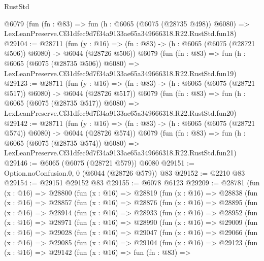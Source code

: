 \begin{lexlean}{RustStd}
\begin{coremodule}
    @6079
    (fun (fn : @83) =>
    fun (h : @6065 (@6075 (@28735 @498)) @6080) =>
    LexLeanPreserve.Cf31dfec9d7f34a9133ae65a349666318.R22.RustStd.fun18)
@29104 := @28711
    (fun (y : @16) => (fn : @83) -> (h : @6065 (@6075 (@28721 @506)) @6080) -> @6044 (@28726 @506))
    @6079
    (fun (fn : @83) =>
    fun (h : @6065 (@6075 (@28735 @506)) @6080) =>
    LexLeanPreserve.Cf31dfec9d7f34a9133ae65a349666318.R22.RustStd.fun19)
@29123 := @28711
    (fun (y : @16) => (fn : @83) -> (h : @6065 (@6075 (@28721 @517)) @6080) -> @6044 (@28726 @517))
    @6079
    (fun (fn : @83) =>
    fun (h : @6065 (@6075 (@28735 @517)) @6080) =>
    LexLeanPreserve.Cf31dfec9d7f34a9133ae65a349666318.R22.RustStd.fun20)
@29142 := @28711
    (fun (y : @16) => (fn : @83) -> (h : @6065 (@6075 (@28721 @574)) @6080) -> @6044 (@28726 @574))
    @6079
    (fun (fn : @83) =>
    fun (h : @6065 (@6075 (@28735 @574)) @6080) =>
    LexLeanPreserve.Cf31dfec9d7f34a9133ae65a349666318.R22.RustStd.fun21)
@29146 := @6065 (@6075 (@28721 @579)) @6080
@29151 := Option.noConfusion.{0, 0} (@6044 (@28726 @579)) @83
@29152 := @2210 @83
@29154 := @29151 @29152 @83
@29155 := @6078 @6123
@29209 := @28781
    (fun (x : @16) =>
    @28800
      (fun (x : @16) =>
      @28819
        (fun (x : @16) =>
        @28838
          (fun (x : @16) =>
          @28857
            (fun (x : @16) =>
            @28876
              (fun (x : @16) =>
              @28895
                (fun (x : @16) =>
                @28914
                  (fun (x : @16) =>
                  @28933
                    (fun (x : @16) =>
                    @28952
                      (fun (x : @16) =>
                      @28971
                        (fun (x : @16) =>
                        @28990
                          (fun (x : @16) =>
                          @29009
                            (fun (x : @16) =>
                            @29028
                              (fun (x : @16) =>
                              @29047
                                (fun (x : @16) =>
                                @29066
                                  (fun (x : @16) =>
                                  @29085
                                    (fun (x : @16) =>
                                    @29104
                                      (fun (x : @16) =>
                                      @29123
                                        (fun (x : @16) =>
                                        @29142
                                          (fun (x : @16) =>
                                          fun (fn : @83) =>

\end{coremodule}
\end{lexlean}

